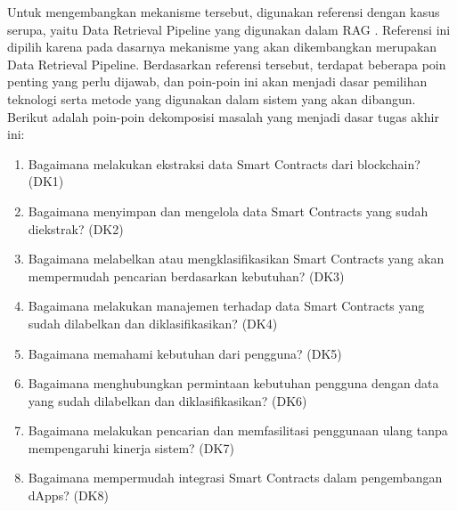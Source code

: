 
Untuk mengembangkan mekanisme tersebut, digunakan referensi dengan kasus serupa, yaitu Data Retrieval Pipeline yang digunakan dalam RAG \parencite{CrateDB_RAG_Pipelines}. Referensi ini dipilih karena pada dasarnya mekanisme yang akan dikembangkan merupakan Data Retrieval Pipeline. Berdasarkan referensi tersebut, terdapat beberapa poin penting yang perlu dijawab, dan poin-poin ini akan menjadi dasar pemilihan teknologi serta metode yang digunakan dalam sistem yang akan dibangun. Berikut adalah poin-poin dekomposisi masalah yang menjadi dasar tugas akhir ini:

\begin{enumerate}
	\item Bagaimana melakukan ekstraksi data Smart Contracts dari blockchain? (DK1)
	\item Bagaimana menyimpan dan mengelola data Smart Contracts yang sudah diekstrak? (DK2)
	\item Bagaimana melabelkan atau mengklasifikasikan Smart Contracts yang akan mempermudah pencarian berdasarkan kebutuhan? (DK3)
	\item Bagaimana melakukan manajemen terhadap data Smart Contracts yang sudah dilabelkan dan diklasifikasikan? (DK4)
	\item Bagaimana memahami kebutuhan dari pengguna? (DK5)
	\item Bagaimana menghubungkan permintaan kebutuhan pengguna dengan data yang sudah dilabelkan dan diklasifikasikan? (DK6)
	\item Bagaimana melakukan pencarian dan memfasilitasi penggunaan ulang tanpa mempengaruhi kinerja sistem? (DK7)
	\item Bagaimana mempermudah integrasi Smart Contracts dalam pengembangan dApps? (DK8)
\end{enumerate}

